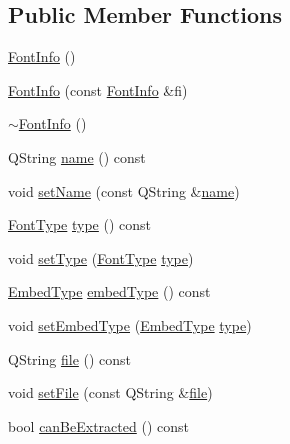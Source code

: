 \subsection*{Public Member Functions}
\begin{DoxyCompactItemize}
\item 
\hyperlink{classOkular_1_1FontInfo_a2887c328096a1b86cdffd37a71efe399}{Font\+Info} ()
\item 
\hyperlink{classOkular_1_1FontInfo_a53208547826cd7ac75458c83c23bb1e1}{Font\+Info} (const \hyperlink{classOkular_1_1FontInfo}{Font\+Info} \&fi)
\item 
\hyperlink{classOkular_1_1FontInfo_ab3d980a3eb88722a36c9b26e8940b265}{$\sim$\+Font\+Info} ()
\item 
Q\+String \hyperlink{classOkular_1_1FontInfo_ab21eddbfe75550441d2484185c0b2a02}{name} () const 
\item 
void \hyperlink{classOkular_1_1FontInfo_abd20d06c554455aee07624a6b3917e4e}{set\+Name} (const Q\+String \&\hyperlink{classOkular_1_1FontInfo_ab21eddbfe75550441d2484185c0b2a02}{name})
\item 
\hyperlink{classOkular_1_1FontInfo_a9a7fc21a728ffa7296546c8a527e43f6}{Font\+Type} \hyperlink{classOkular_1_1FontInfo_a75dd29ab1d541620de49418e3aeeb33f}{type} () const 
\item 
void \hyperlink{classOkular_1_1FontInfo_a3e4ff54705b7a349743e4634dfc373a8}{set\+Type} (\hyperlink{classOkular_1_1FontInfo_a9a7fc21a728ffa7296546c8a527e43f6}{Font\+Type} \hyperlink{classOkular_1_1FontInfo_a75dd29ab1d541620de49418e3aeeb33f}{type})
\item 
\hyperlink{classOkular_1_1FontInfo_a549f8b2d829aead40f868ba5a6bf427f}{Embed\+Type} \hyperlink{classOkular_1_1FontInfo_ac5eddd02cc975110f98e3b3862a1d13e}{embed\+Type} () const 
\item 
void \hyperlink{classOkular_1_1FontInfo_af7ce75552d5064e350bf9a2e02dbffd0}{set\+Embed\+Type} (\hyperlink{classOkular_1_1FontInfo_a549f8b2d829aead40f868ba5a6bf427f}{Embed\+Type} \hyperlink{classOkular_1_1FontInfo_a75dd29ab1d541620de49418e3aeeb33f}{type})
\item 
Q\+String \hyperlink{classOkular_1_1FontInfo_ac98282e78d604d7def92660e49267ab1}{file} () const 
\item 
void \hyperlink{classOkular_1_1FontInfo_aa18933d938e0a5ac217f8a48acd88bca}{set\+File} (const Q\+String \&\hyperlink{classOkular_1_1FontInfo_ac98282e78d604d7def92660e49267ab1}{file})
\item 
bool \hyperlink{classOkular_1_1FontInfo_a23a35c6fb0ca030ccf8b0a027e3d904d}{can\+Be\+Extracted} () const 

\end{DoxyCompactItemize}
